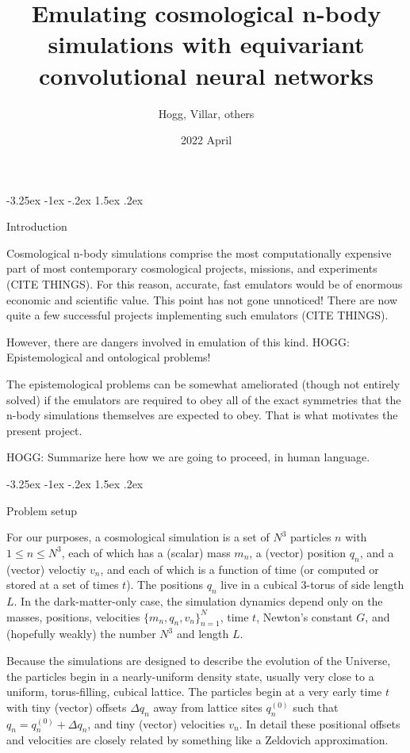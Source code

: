 \documentclass{article}
\title{\bfseries%
Emulating cosmological n-body simulations with equivariant convolutional neural networks}
\author{Hogg, Villar, others}
\date{2022 April}
\makeatletter
\theoremstyle{definition}
\renewcommand\section{\@startsection {section}{1}{\z@}%
  {-3.25ex \@plus -1ex \@minus -.2ex}%
  {1.5ex \@plus .2ex}%
  {\raggedright\normalfont\large\bfseries}}
\makeatother
\begin{document}
\maketitle\thispagestyle{empty}

\section{Introduction}

Cosmological n-body simulations comprise the most computationally expensive part of most contemporary cosmological projects, missions, and experiments (CITE THINGS).
For this reason, accurate, fast emulators would be of enormous economic and scientific value.
This point has not gone unnoticed!
There are now quite a few successful projects implementing such emulators (CITE THINGS).

However, there are dangers involved in emulation of this kind.
HOGG: Epistemological and ontological problems!

The epistemological problems can be somewhat ameliorated (though not entirely solved) if the emulators are required to obey all of the exact symmetries that the n-body simulations themselves are expected to obey.
That is what motivates the present project.

HOGG: Summarize here how we are going to proceed, in human language.

\section{Problem setup}

For our purposes, a cosmological simulation is a set of $N^3$ particles $n$ with $1\leq n\leq N^3$, each of which has a (scalar) mass $m_n$, a (vector) position $q_n$, and a (vector) veloctiy $v_n$, and each of which is a function of time (or computed or stored at a set of times $t$).
The positions $q_n$ live in a cubical 3-torus of side length $L$.
In the dark-matter-only case, the simulation dynamics depend only on the masses, positions, velocities $\{m_n, q_n, v_n\}_{n=1}^N$, time $t$, Newton's constant $G$, and (hopefully weakly) the number $N^3$ and length $L$.

Because the simulations are designed to describe the evolution of the Universe, the particles begin in a nearly-uniform density state, usually very close to a uniform, torus-filling, cubical lattice.
The particles begin at a very early time $t$ with tiny (vector) offsets $\Delta q_n$ away from lattice sites $q^{(0)}_n$ such that $q_n = q^{(0)}_n + \Delta q_n$, and tiny (vector) velocities $v_n$.
In detail these positional offsets and velocities are closely related by something like a Zeldovich approximation.
\end{document}
